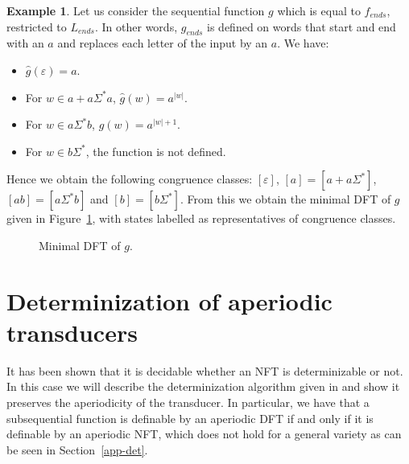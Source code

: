 \documentclass[12pt]{report}
\theoremstyle{definition}
\newtheorem{xmp}{Example}[section]
\theoremstyle{remark}
\begin{document}
\begin{xmp}
Let us consider the sequential function $g$ which is equal to $f_{ends}$, restricted to $L_{ends}$.
In other words, $g_{ends}$ is defined on words that start and end with an $a$ and replaces each letter of the input by an $a$.
We have:
\begin{itemize}
\item $\widehat g(\varepsilon)=a$.
\item For $w\in a+a\Sigma^\ast a$, $\widehat g(w)=a^{|w|}$.
\item For $w\in a\Sigma^\ast b$, $\widehat g(w)=a^{|w|+1}$.
\item For $w\in b\Sigma^\ast$, the function is not defined.
\end{itemize}
Hence we obtain the following congruence classes:
$[\varepsilon]$, $[a]=[a+a\Sigma^\ast]$,  $[ab]=[a\Sigma^\ast b]$ and $[b]=[b\Sigma^\ast]$.
From this we obtain the minimal DFT of $g$ given in Figure~\ref{figdft}, with states labelled as representatives of congruence classes.

\begin{figure}[t]
\centering
{}
\caption{Minimal DFT of $g$.}
\label{figdft}
\end{figure}

\end{xmp}



\section{Determinization of aperiodic transducers}
It has been shown that it is decidable whether an NFT is determinizable or not. In this case we will describe the determinization algorithm given in \cite{bealc02} and show it preserves the aperiodicity of the transducer.
In particular, we have that a subsequential function is definable by an aperiodic DFT if and only if it is definable by an aperiodic NFT, which does not hold for a general variety as can be seen in Section~\ref{app-det}.
\end{document}
